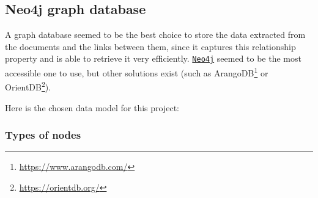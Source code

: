 \subsection{Neo4j graph database} \label{ssec:neo4j-graph-database}

A graph database seemed to be the best choice to store the data extracted from the documents and the links between them, since it captures this relationship property and is able to retrieve it very efficiently. \href{https://neo4j.com/}{\texttt{Neo4j}} seemed to be the most accessible one to use, but other solutions exist (such as ArangoDB\footnote{\url{https://www.arangodb.com/}} or OrientDB\footnote{\url{https://orientdb.org/}}).

Here is the chosen data model for this project:

\subsubsection{Types of nodes} \label{sssec:types-of-nodes}

